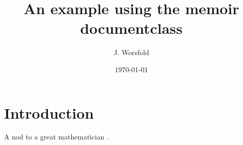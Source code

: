 \documentclass[11pt, a4paper, oneside]{memoir}
\begin{document}
\author{J. Worsfold}
\date{\today}
\title{An example using the memoir documentclass}
\pagestyle{mystyle}

\maketitle

\chapter{Introduction}

A nod to a great mathematician \cite{turing1990chemical}.

\lipsum




\end{document}
